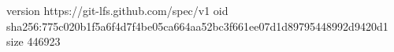 version https://git-lfs.github.com/spec/v1
oid sha256:775c020b1f5a6f4d7f4be05ca664aa52bc3f661ee07d1d89795448992d9420d1
size 446923
